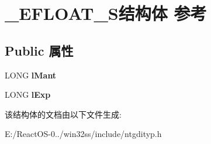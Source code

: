 \hypertarget{struct___e_f_l_o_a_t___s}{}\section{\+\_\+\+E\+F\+L\+O\+A\+T\+\_\+\+S结构体 参考}
\label{struct___e_f_l_o_a_t___s}
\subsection*{Public 属性}
\begin{DoxyCompactItemize}
\item 
\mbox{\label{struct___e_f_l_o_a_t___s_afe01271e98e105d4d90b6ca31aba240e}} 
L\+O\+NG {\bfseries l\+Mant}
\item 
\mbox{\label{struct___e_f_l_o_a_t___s_acea1ba56d050db052a14c6b9a158e472}} 
L\+O\+NG {\bfseries l\+Exp}
\end{DoxyCompactItemize}


该结构体的文档由以下文件生成\+:\begin{DoxyCompactItemize}
\item 
E\+:/\+React\+O\+S-\/0../win32ss/include/ntgdityp.\+h\end{DoxyCompactItemize}
